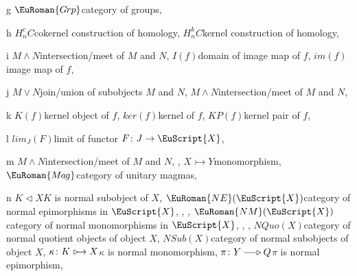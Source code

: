 \documentclass [12pt,oneside]{book}%
\theoremstyle{captionstyle}  %
\newcommand{\IndSep}{\qquad}
\newcommand{\normal}{\ensuremath{\lhd}}
\newcommand{\from}{\colon}				%
\newcommand{\Mono}{\rightarrowtail}			%
\newcommand{\NEpi}{-\hspace{-0.8ex}-\hspace{-0.7ex}\triangleright}	%
\newcommand{\NMono}{\ \triangleright\hspace{-0.9ex}\rightarrow}			%
\newcommand{\Magmas}{\EuRoman{M{\kern -.12ex}a{\kern -.15ex}g}}			%
\newcommand{\Grps}{\EuRoman{G{\kern -.15ex}rp}}				%
\newcommand{\Ctgry}[1]{\EuScript{#1}}					%
\newcommand{\NSubObjcts}[1]{\mathit{NSub}(#1)}	%
\newcommand{\NQuoObjcts}[1]{\textit{NQuo}(#1)}	%
\newcommand{\NMonoCat}[1]{\EuRoman{NM}(\Ctgry{#1})}				%
\newcommand{\NEpiCat}[1]{\EuRoman{NE}(\Ctgry{#1})}				%
\newcommand{\meet}{\ensuremath{\wedge}}
\newcommand{\join}{\ensuremath{\vee}}
\newcommand{\LimOfOver}[2]{\textit{lim}_{#2}\left(#1\right)}    %
\newcommand{\Ker}[1]{\textit{K}(#1)}		     	%
\newcommand{\KerMap}[1]{\textit{ker}(#1)}		     	%
\newcommand{\Img}[1]{\textit{I}(#1)}	               %
\newcommand{\ImgMap}[1]{\textit{im}(#1)}	      %
\newcommand{\KrnlPr}[1]{\textit{KP}\left(#1\right)}			%
\newcommand{\HmlgyKer}[2]{H^{k}_{#1}#2}           %
\newcommand{\HmlgyCoKer}[2]{H^{c}_{#1}#2}         %
\begin{document}
\begin{theindex}
    \indexspace

    \item g
    \subitem $\Grps $\IndSep category of groups, 

    \indexspace

    \item h
    \subitem $\HmlgyCoKer {n}{C}$\IndSep cokernel construction of homology,
    \subitem $\HmlgyKer {n}{C}$\IndSep kernel construction of homology,

    \indexspace

    \item i
    \subitem $M\meet N$\IndSep intersection/meet of $M$ and $N$,
    \subitem $\Img {f}$\IndSep domain of image map of $f$,
    \subitem $\ImgMap {f}$\IndSep image map of $f$, 

    \indexspace

    \item j
    \subitem $M\join N$\IndSep join/union of subobjects $M$ and $N$,
    \subitem $M\meet N$\IndSep intersection/meet of $M$ and $N$,

    \indexspace

    \item k
    \subitem $\Ker {f}$\IndSep kernel object of $f$, 
    \subitem $\KerMap {f}$\IndSep kernel of $f$, 
    \subitem $\KrnlPr {f}$\IndSep kernel pair of $f$, 

    \indexspace

    \item l
    \subitem $\LimOfOver {F}{J}$\IndSep limit of functor $F\from J\to \EuScript {X}$,

    \indexspace

    \item m
    \subitem $M\meet N$\IndSep intersection/meet of $M$ and $N$,
    , 
    \subitem $X\Mono Y$\IndSep monomorphism, 
    \subitem $\Magmas $\IndSep category of unitary magmas,

    \indexspace

    \item n
    \subitem $K\normal X$\IndSep $K$ is normal subobject of $X$,
    \subitem $\NEpiCat {X}$\IndSep category of normal epimorphisms in $\Ctgry {X}$,
    , , 
    \subitem $\NMonoCat {X}$\IndSep category of normal monomorphisms in $\Ctgry {X}$,
    , , 
    \subitem $\NQuoObjcts {X}$\IndSep category of normal quotient objects of object $X$,
    \subitem $\NSubObjcts {X}$\IndSep category of normal subobjects of object $X$,
    \subitem $\kappa \from K\NMono X$\IndSep $\kappa $ is normal monomorphism,
    \subitem $\pi \from Y\NEpi Q$\IndSep $\pi $ is normal epimorphism,


\end{theindex}
\end{document}
